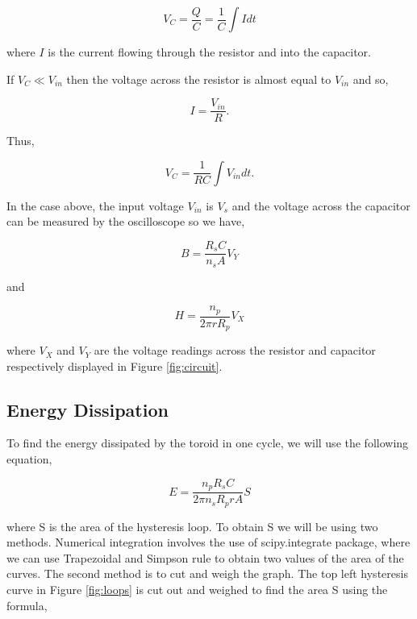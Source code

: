 \documentclass{article}
\begin{document}
\begin{equation}
    V_C = \frac{Q}{C} = \frac{1}{C}\int I dt
\end{equation}

where $I$ is the current flowing through the resistor and into the capacitor.

If $V_C \ll V_{in}$ then the voltage across the resistor is almost equal to $V_{in}$ and so,

\begin{equation}
    I = \frac{V_{in}}{R}.
\end{equation}

Thus,

\begin{equation}
    V_C = \frac{1}{RC} \int V_{in} dt.
\end{equation}

In the case above, the input voltage $V_{in}$ is $V_s$ and the voltage across the capacitor can
be measured by the oscilloscope so we have,

\begin{equation}
    B = \frac{R_s C}{n_s A}V_Y
\end{equation}

and 

\begin{equation}
    H = \frac{n_p}{2\pi r R_p}V_X
\end{equation}

where $V_X$ and $V_Y$ are the voltage readings across the resistor and capacitor respectively 
displayed in Figure \ref{fig:circuit}.

\subsection{Energy Dissipation}
To find the energy dissipated by the toroid in one cycle, we will use the following equation,

\begin{equation}
    E = \frac{n_pR_sC}{2\pi n_s R_p r A}S
\end{equation}

where S is the area of the hysteresis loop. To obtain S we will be using two methods. Numerical
integration involves the use of scipy.integrate package, where we can use Trapezoidal and Simpson
rule to obtain two values of the area of the curves. The second method is to cut and weigh the 
graph. The top left hysteresis curve in Figure \ref{fig:loops} is cut out and weighed to find the
area S using the formula,
\end{document}
